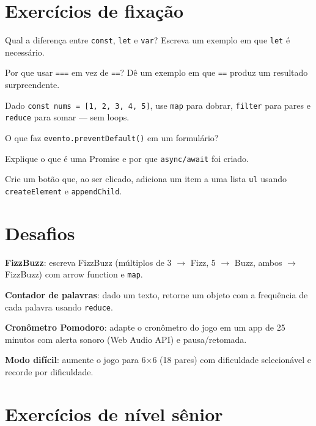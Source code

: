 \section{Exercícios de fixação}

\begin{exercicios}
  \item Qual a diferença entre \texttt{const}, \texttt{let} e \texttt{var}?
  Escreva um exemplo em que \texttt{let} é necessário.
  \item Por que usar \texttt{===} em vez de \texttt{==}? Dê um exemplo em que
  \texttt{==} produz um resultado surpreendente.
  \item Dado \texttt{const nums = [1, 2, 3, 4, 5]}, use \texttt{map} para
  dobrar, \texttt{filter} para pares e \texttt{reduce} para somar — sem loops.
  \item O que faz \texttt{evento.preventDefault()} em um formulário?
  \item Explique o que é uma Promise e por que \texttt{async/await} foi criado.
  \item Crie um botão que, ao ser clicado, adiciona um item a uma lista
  \texttt{ul} usando \texttt{createElement} e \texttt{appendChild}.
\end{exercicios}

\section{Desafios}

\begin{desafios}
  \item \textbf{FizzBuzz}: escreva FizzBuzz (múltiplos de 3 $\rightarrow$ Fizz,
  5 $\rightarrow$ Buzz, ambos $\rightarrow$ FizzBuzz) com arrow function e \texttt{map}.
  \item \textbf{Contador de palavras}: dado um texto, retorne um objeto com a
  frequência de cada palavra usando \texttt{reduce}.
  \item \textbf{Cronômetro Pomodoro}: adapte o cronômetro do jogo em um app de
  25 minutos com alerta sonoro (Web Audio API) e pausa/retomada.
  \item \textbf{Modo difícil}: aumente o jogo para 6×6 (18 pares) com
  dificuldade selecionável e recorde por dificuldade.
\end{desafios}

\section{Exercícios de nível sênior}

